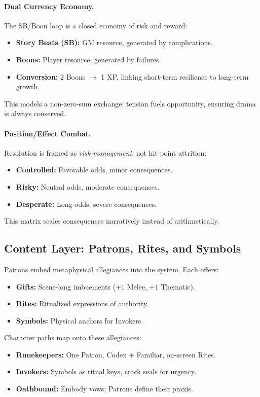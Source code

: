 \paragraph{Dual Currency Economy.}
The SB/Boon loop is a closed economy of risk and reward:
\begin{itemize}
  \item \textbf{Story Beats (SB):} GM resource, generated by complications.
  \item \textbf{Boons:} Player resource, generated by failures.
  \item \textbf{Conversion:} 2 Boons $\rightarrow$ 1 XP, linking short-term resilience to long-term growth.
\end{itemize}

This models a non-zero-sum exchange: tension fuels opportunity, ensuring drama is always conserved.

\paragraph{Position/Effect Combat.}
Resolution is framed as \emph{risk management}, not hit-point attrition:
\begin{itemize}
  \item \textbf{Controlled:} Favorable odds, minor consequences.
  \item \textbf{Risky:} Neutral odds, moderate consequences.
  \item \textbf{Desperate:} Long odds, severe consequences.
\end{itemize}

This matrix scales consequences narratively instead of arithmetically.

\subsection{Content Layer: Patrons, Rites, and Symbols}

Patrons embed metaphysical allegiances into the system. Each offers:
\begin{itemize}
  \item \textbf{Gifts:} Scene-long imbuements (\(+1\) Melee, \(+1\) Thematic).
  \item \textbf{Rites:} Ritualized expressions of authority.
  \item \textbf{Symbols:} Physical anchors for Invokers.
\end{itemize}

Character paths map onto these allegiances:
\begin{itemize}
  \item \textbf{Runekeepers:} One Patron, Codex + Familiar, on-screen Rites.
  \item \textbf{Invokers:} Symbols as ritual keys, crack seals for urgency.
  \item \textbf{Oathbound:} Embody vows; Patrons define their praxis.
\end{itemize}


